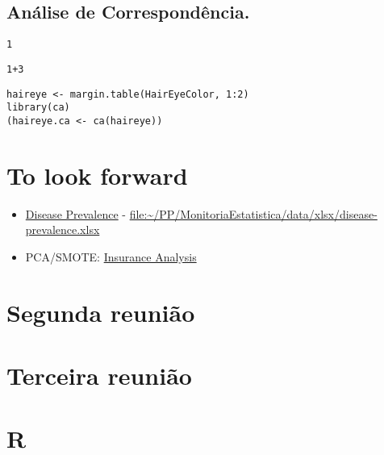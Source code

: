 \documentclass[12pt,a4paper]{article}
\begin{document}
\subsection{Análise de Correspondência.}
\label{sec:org9c86b73}

\begin{verbatim}
1
\end{verbatim}

\begin{verbatim}
1+3
\end{verbatim}


\begin{verbatim}
haireye <- margin.table(HairEyeColor, 1:2)
library(ca)
(haireye.ca <- ca(haireye))
\end{verbatim}


\section{To look forward}
\label{sec:org07e090d}
\begin{itemize}
\item \href{Literature/Article-data/fgene-12-690366.pdf}{Disease Prevalence} -
\href{data/xlsx/disease-prevalence.xlsx}{file:\textasciitilde{}/PP/MonitoriaEstatistica/data/xlsx/disease-prevalence.xlsx}
\item PCA/SMOTE: \href{https://www.kaggle.com/rafjaa/resampling-strategies-for-imbalanced-datasets}{Insurance Analysis}
\end{itemize}
\section{Segunda reunião}
\label{sec:org77e14ad}
\section{Terceira reunião}
\label{sec:org95b92c2}
\section{R}
\label{sec:org90fc2ac}
\end{document}
